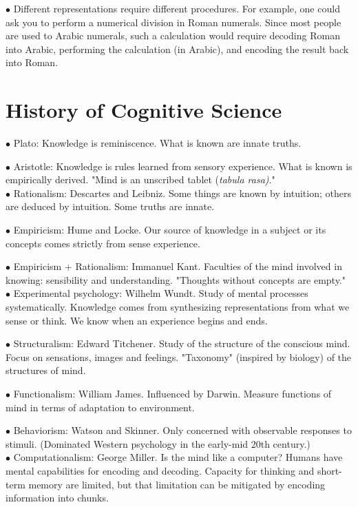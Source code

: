 \documentclass[english,openany]{book}
\begin{document}
$\bullet$ Different representations require different procedures. For example, one could ask you to perform a numerical division in Roman numerals. Since most people are used to Arabic numerals, such a calculation would require decoding Roman into Arabic, performing the calculation (in Arabic), and encoding the result back into Roman.\\

\section{History of Cognitive Science}

$\bullet$ Plato: Knowledge is reminiscence. What is known are innate truths.

$\bullet$ Aristotle: Knowledge is rules learned from sensory experience. What is known is empirically derived. "Mind is an unscribed tablet (\textit{tabula rasa)}."\\

$\bullet$ Rationalism: Descartes and Leibniz. Some things are known by intuition; others are deduced by intuition. Some truths are innate.

$\bullet$ Empiricism: Hume and Locke. Our source of knowledge in a subject or its concepts comes strictly from sense experience.

$\bullet$ Empiricism + Rationalism: Immanuel Kant. Faculties of the mind involved in knowing: sensibility and understanding. "Thoughts without concepts are empty."\\

$\bullet$ Experimental psychology: Wilhelm Wundt. Study of mental processes systematically. Knowledge comes from synthesizing representations from what we sense or think. We know when an experience begins and ends.

$\bullet$ Structuralism: Edward Titchener. Study of the structure of the conscious mind. Focus on sensations, images and feelings. "Taxonomy" (inspired by biology) of the structures of mind.

$\bullet$ Functionalism: William James. Influenced by Darwin. Measure functions of mind in terms of adaptation to environment.

$\bullet$ Behaviorism: Watson and Skinner. Only concerned with observable responses to stimuli. (Dominated Western psychology in the early-mid 20th century.)\\

$\bullet$ Computationalism: George Miller. Is the mind like a computer? Humans have mental capabilities for encoding and decoding. Capacity for thinking and short-term memory are limited, but that limitation can be mitigated by encoding information into chunks.
\end{document}
